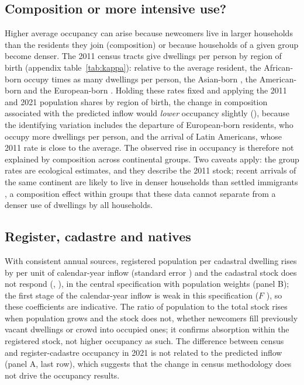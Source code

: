 \documentclass[11pt,a4paper]{article}
\begin{document}
\subsection{Composition or more intensive use?}

Higher average occupancy can arise because newcomers live in larger households than the residents they join (composition) or because households of a given group become denser. The 2011 census tracts give dwellings per person by region of birth (appendix table~\ref{tab:kappa}): relative to the average resident, the African-born occupy \kapAfr{} times as many dwellings per person, the Asian-born \kapAsi, the American-born \kapAme{} and the European-born \kapEur. Holding these rates fixed and applying the 2011 and 2021 population shares by region of birth, the change in composition associated with the predicted inflow would \emph{lower} occupancy slightly (\compC), because the identifying variation includes the departure of European-born residents, who occupy more dwellings per person, and the arrival of Latin Americans, whose 2011 rate is close to the average. The observed rise in occupancy is therefore not explained by composition across continental groups. Two caveats apply: the group rates are ecological estimates, and they describe the 2011 stock; recent arrivals of the same continent are likely to live in denser households than settled immigrants \citep{myerslee1996}, a composition effect within groups that these data cannot separate from a denser use of dwellings by all households.

\subsection{Register, cadastre and natives}

With consistent annual sources, registered population per cadastral dwelling rises by \ratioP{} per unit of calendar-year inflow (standard error \ratioPse) and the cadastral stock does not respond (\stockP, \stockPse), in the central specification with population weights (panel B); the first stage of the calendar-year inflow is weak in this specification ($F$ \panelF), so these coefficients are indicative. The ratio of population to the total stock rises when population grows and the stock does not, whether newcomers fill previously vacant dwellings or crowd into occupied ones; it confirms absorption within the registered stock, not higher occupancy as such. The difference between census and register-cadastre occupancy in 2021 is not related to the predicted inflow (panel A, last row), which suggests that the change in census methodology does not drive the occupancy results.
\end{document}

